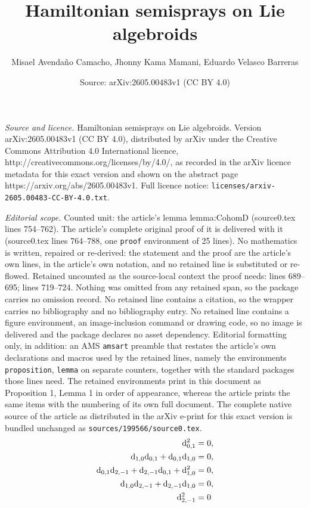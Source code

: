 \documentclass[10pt,a4paper]{amsart}
\title{Hamiltonian semisprays on Lie algebroids}
\author{Misael Avenda\~no Camacho, Jhonny Kama Mamani, Eduardo Velasco Barreras}
\date{Source: arXiv:2605.00483v1 (CC BY 4.0)}
\newcommand{\dR}{\mathrm{d}_{2,-1}}
\renewcommand{\dh}{%
  \relax\ifmmode\mathrm{d}_{1,0}\else\olddh\fi
}
\newcommand{\dv}{\mathrm{d}_{0,1}}
\begin{document}
\maketitle

\noindent\emph{Source and licence.} Hamiltonian semisprays on Lie algebroids. Version arXiv:2605.00483v1 (CC BY 4.0), distributed by arXiv under the Creative Commons Attribution 4.0 International licence, http://creativecommons.org/licenses/by/4.0/, as recorded in the arXiv licence metadata for this exact version and shown on the abstract page https://arxiv.org/abs/2605.00483v1. Full licence notice: \texttt{licenses/arxiv-2605.00483-CC-BY-4.0.txt}.\par\smallskip

\noindent\textit{Editorial scope.} Counted unit: the article's lemma lemma:CohomD (source0.tex lines 754--762). The article's complete original proof of it is delivered with it (source0.tex lines 764--788, one \texttt{proof} environment of 25 lines). No mathematics is written, repaired or re-derived: the statement and the proof are the article's own lines, in the article's own notation, and no retained line is substituted or re-flowed.  Retained uncounted as the source-local context the proof needs: lines 689--695; lines 719--724.  Nothing was omitted from any retained span, so the package carries no omission record.  No retained line contains a citation, so the wrapper carries no bibliography and no bibliography entry.  No retained line contains a figure environment, an image-inclusion command or drawing code, so no image is delivered and the package declares no asset dependency.  Editorial formatting only, in addition: an AMS \texttt{amsart} preamble that restates the article's own declarations and macros used by the retained lines, namely the environments \texttt{proposition}, \texttt{lemma} on separate counters, together with the standard packages those lines need.  The retained environments print in this document as Proposition 1, Lemma 1 in order of appearance, whereas the article prints the same items with the numbering of its own full document.  The complete native source of the article as distributed in the arXiv e-print for this exact version is bundled unchanged as \texttt{sources/199566/source0.tex}.
\begin{align}
    \dv^2 &= 0, \label{eq:Cob02} \\
    \dh\dv + \dv\dh &= 0, \label{eq:Cob11} \\
    \dv\dR + \dR\dv + \dh^2 &= 0, \label{eq:Cob20} \\
    \dh\dR + \dR\dh &= 0, \label{eq:Cob3-1} \\
    \dR^2 &= 0 \label{eq:Cob4-2}
\end{align}
\end{document}
